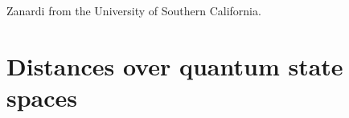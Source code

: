Zanardi from the University of Southern California.

\section{Distances over quantum state spaces}

  
